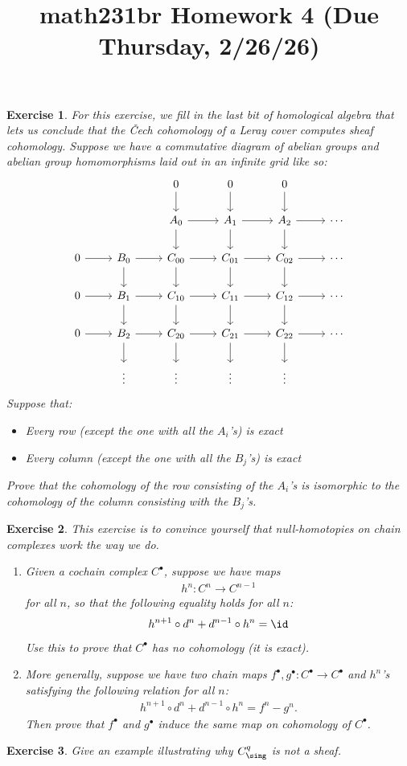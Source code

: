 \documentclass[11pt]{amsart}
\title{math231br Homework 4 (Due Thursday, 2/26/26)}
\newtheorem{hwexercise}{Exercise}
\begin{document}
\maketitle

\begin{hwexercise} For this exercise, we fill in the last bit of homological algebra that lets us conclude that the \v{C}ech cohomology of a Leray cover computes sheaf cohomology. Suppose we have a commutative diagram of abelian groups and abelian group homomorphisms laid out in an infinite grid like so:
\[ \begin{tikzcd}
     &  & 0\dar & 0\dar & 0\dar & \\
     &  & A_0\rar\dar & A_1\rar\dar & A_2\rar\dar & \cdots\\
    0\rar & B_0\rar\dar & C_{00}\rar\dar & C_{01}\rar\dar  & C_{02}\rar\dar  & \cdots \\
    0\rar & B_1\rar\dar & C_{10}\rar\dar & C_{11}\rar\dar  & C_{12}\rar\dar  & \cdots \\
    0\rar & B_2\rar\dar & C_{20}\rar\dar & C_{21}\rar\dar  & C_{22}\rar\dar  & \cdots \\
    & \vdots  & \vdots  & \vdots  & \vdots  & 
\end{tikzcd} \]
Suppose that:
\begin{itemize}
    \item Every row (except the one with all the $A_i$'s) is exact
    \item Every column (except the one with all the $B_j$'s) is exact
\end{itemize}
Prove that the cohomology of the row consisting of the $A_i$'s is isomorphic to the cohomology of the column consisting with the $B_j$'s.
\end{hwexercise}

\begin{hwexercise} This exercise is to convince yourself that null-homotopies on chain complexes work the way we do.
\begin{enumerate}
    \item Given a cochain complex $C^\bullet$, suppose we have maps
    \begin{align*}
        h^n \colon C^n \to C^{n-1}
    \end{align*}
    for all $n$, so that the following equality holds for all $n$:
    \begin{align*}
        h^{n+1}\circ d^n + d^{n-1}\circ h^n = \id
    \end{align*}
    Use this to prove that $C^\bullet$ has no cohomology (it is exact).

    \item More generally, suppose we have two chain maps $f^\bullet, g^\bullet \colon C^\bullet \to C^\bullet$ and $h^n$'s satisfying the following relation for all $n$:
    \begin{align*}
        h^{n+1}\circ d^n + d^{n-1}\circ h^n = f^n - g^n.
    \end{align*}
    Then prove that $f^\bullet$ and $g^\bullet$ induce the same map on cohomology of $C^\bullet$.
\end{enumerate}
\end{hwexercise}


\begin{hwexercise} Give an example illustrating why $C^q_\sing$ is not a sheaf.
\end{hwexercise}
\end{document}
